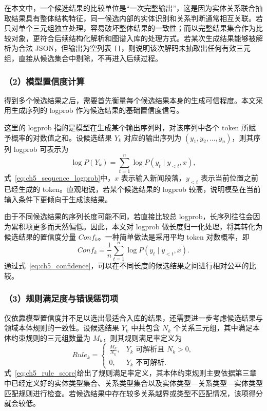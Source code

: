 在本文中，一个候选结果的比较单位是“一次完整输出”，这是因为实体关系联合抽取结果具有整体结构特征，同一候选内部的实体识别和关系判断通常相互关联。若只对单个三元组独立处理，容易破坏整体结果的一致性；而以完整结果集合作为比较对象，更符合后续结构化解析和图谱入库的处理方式。若某次生成结果能够被解析为合法 JSON，但输出为空列表 \texttt{[]}，则说明该次解码未抽取出任何有效三元组，直接从候选集合中剔除，不再进入后续过程。

\subsubsection*{（2）模型置信度计算}

得到多个候选结果之后，需要首先衡量每个候选结果本身的生成可信程度。本文采用生成序列的 logprob 作为候选结果的基础置信度信号。

这里的 logprob 指的是模型在生成某个输出序列时，对该序列中各个 token 所赋予概率的对数值之和。设候选结果 $Y_k$ 对应的输出序列为 $(y_1,y_2,\dots,y_n)$，则其序列 logprob 可表示为
\begin{equation}
\log P(Y_k)=\sum_{t=1}^{n}\log P(y_t \mid y_{<t},x),
\label{eq:ch5_sequence_logprob}
\end{equation}
式~\eqref{eq:ch5_sequence_logprob}中，$x$ 表示输入新闻段落，$y_{<t}$ 表示当前位置之前已经生成的 token。直观地说，若某个候选结果的 logprob 较高，说明模型在当前输入条件下更倾向于生成该结果。

由于不同候选结果的序列长度可能不同，若直接比较总 logprob，长序列往往会因为累积项更多而天然偏低。因此，本文对 logprob 做长度归一化处理，将其转化为候选结果的置信度分量 $Conf_k$。一种简单做法是采用平均 token 对数概率，即
\begin{equation}
Conf_k=\frac{1}{n}\sum_{t=1}^{n}\log P(y_t \mid y_{<t},x).
\label{eq:ch5_confidence}
\end{equation}
通过式~\eqref{eq:ch5_confidence}，可以在不同长度的候选结果之间进行相对公平的比较。

\subsubsection*{（3）规则满足度与错误惩罚项}

仅依靠模型置信度并不足以选出最适合入库的结果，还需要进一步考虑候选结果与领域本体规则的一致性。设候选结果 $Y_k$ 中共包含 $N_k$ 个关系三元组，其中满足本体约束规则的三元组数量为 $M_k$，则其规则满足率定义为
\begin{equation}
Rule_k=
\begin{cases}
\frac{M_k}{N_k}, & Y_k \text{ 可解析且 } N_k>0, \\
0, & Y_k \text{ 不可解析}.
\end{cases}
\label{eq:ch5_rule_score}
\end{equation}
式~\eqref{eq:ch5_rule_score}给出了规则满足率定义，其本体约束规则主要依据第三章中已经定义好的实体类型集合、关系类型集合以及实体类型—关系类型—实体类型匹配规则进行检查。若候选结果中存在较多关系越界或类型不匹配情况，该项得分就会较低。

